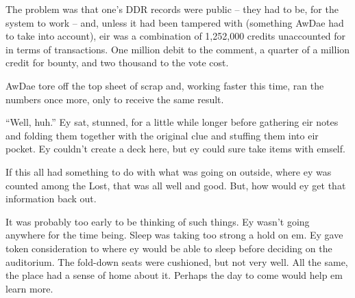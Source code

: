 The problem was that one's DDR records were public -- they had to be, for the system to work -- and, unless it had been tampered with (something AwDae had to take into account), eir was a combination of 1,252,000 credits unaccounted for in terms of transactions.  One million debit to the comment, a quarter of a million credit for bounty, and two thousand to the vote cost.

AwDae tore off the top sheet of scrap and, working faster this time, ran the numbers once more, only to receive the same result.

``Well, huh.''  Ey sat, stunned, for a little while longer before gathering eir notes and folding them together with the original clue and stuffing them into eir pocket.  Ey couldn't create a deck here, but ey could sure take items with emself.

If this all had something to do with what was going on outside, where ey was counted among the Lost, that was all well and good.  But, how would ey get that information back out.

It was probably too early to be thinking of such things.  Ey wasn't going anywhere for the time being.  Sleep was taking too strong a hold on em.  Ey gave token consideration to where ey would be able to sleep before deciding on the auditorium.  The fold-down seats were cushioned, but not very well.  All the same, the place had a sense of home about it.  Perhaps the day to come would help em learn more.
